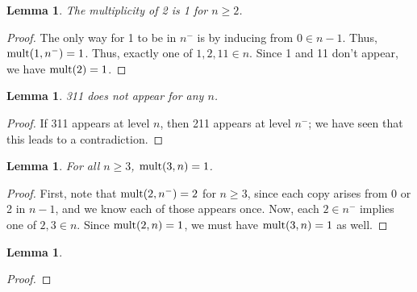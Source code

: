 \documentclass{article}
\theoremstyle{plain}
\newtheorem{lemma}[theorem]{Lemma}
\theoremstyle{definition}
\newcommand{\mult}{\textup{mult}}
\begin{document}
\begin{lemma}
The multiplicity of 2 is 1 for $n \ge 2$.
\end{lemma}
\begin{proof}
The only way for 1 to be in $n^-$ is by inducing from $0 \in n-1$. Thus, $\mult(1,n^-)=1$. Thus, exactly one of $1,2,11 \in n$. Since 1 and 11 don't appear, we have $\mult(2)=1$.
\end{proof}

\begin{lemma}
311 does not appear for any $n$.
\end{lemma}
\begin{proof}
If 311 appears at level $n$, then 211 appears at level $n^-$; we have seen that this leads to a contradiction.
\end{proof}

\begin{lemma}
For all $n \ge 3$, $\mult(3,n) = 1$.
\end{lemma}
\begin{proof}
First, note that $\mult(2,n^-)=2$ for $n \ge 3$, since each copy arises from 0 or 2 in $n-1$, and we know each of those appears once.
Now, each $2 \in n^-$ implies one of $2,3 \in n$. Since $\mult(2,n)=1$, we must have $\mult(3,n)=1$ as well.
\end{proof}

\begin{lemma}

\end{lemma}
\begin{proof}

\end{proof}
\end{document}
